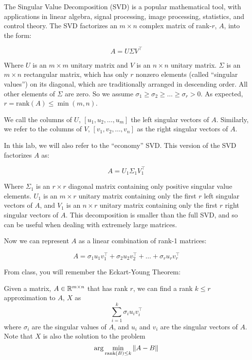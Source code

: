 The Singular Value Decomposition (SVD) is a popular mathematical tool, with applications in linear algebra, signal processing, image processing, statistics, and control theory. The SVD factorizes an $m\times n$ complex matrix of rank-$r$, $A$, into the form:

\[ A = U \Sigma V^\intercal \]

Where $U$ is an $m\times m$ unitary matrix and $V$ is an $n \times n$ unitary matrix. $\Sigma$ is an $m \times n$ rectangular matrix, which has only $r$ nonzero elements (called ``singular values'') on its diagonal, which are traditionally arranged in descending order. All other elements of $\Sigma$ are zero. So we assume $\sigma_1 \geq \sigma_2 \geq \ldots \geq \sigma_r > 0$. As expected, $r = \mathrm{rank}(A) \leq \min(m,n)$.

We call the columns of $U$, $[u_1, u_2, \ldots, u_m]$ the left singular vectors of $A$. Similarly, we refer to the columns of $V$, $[v_1, v_2, \ldots, v_n]$ as the right singular vectors of $A$.

In this lab, we will also refer to the ``economy'' SVD. This version of the SVD factorizes $A$ as:

\[ A = U_1 \Sigma_1 V_1^\intercal \]

Where $\Sigma_1$ is an $r \times r$ diagonal matrix containing only positive singular value elements. $U_1$ is an $m \times r$ unitary matrix containing only the first $r$ left singular vectors of $A$, and $V_1$ is an $n \times r$ unitary matrix containing only the first $r$ right singular vectors of $A$. This decomposition is smaller than the full SVD, and so can be useful when dealing with extremely large matrices.

Now we can represent $A$ as a linear combination of rank-1 matrices:

\[ A = \sigma_1 u_1 v_1^\intercal + \sigma_2 u_2 v_2^\intercal + \ldots + \sigma_r u_r v_r^\intercal \]

From class, you will remember the Eckart-Young Theorem\cite{Eckart1936}:

\begin{theorem}
	Given a matrix, $A \in \mathbb{R}^{m \times n}$ that has rank $r$, we can find a rank $k \leq r$ approximation to $A$, $X$ as
	$$\sum_{i = 1}^k \sigma_i u_i v_i^\top$$
	where $\sigma_i$ are the singular values of $A$, and $u_i$ and $v_i$ are the singular vectors of $A$. Note that $X$ is also the solution to the problem
	$$\arg \min_{\mathrm{rank}\left(B\right) \leq k} \|A - B\|$$
	\label{thm:eckart-young}
\end{theorem}

